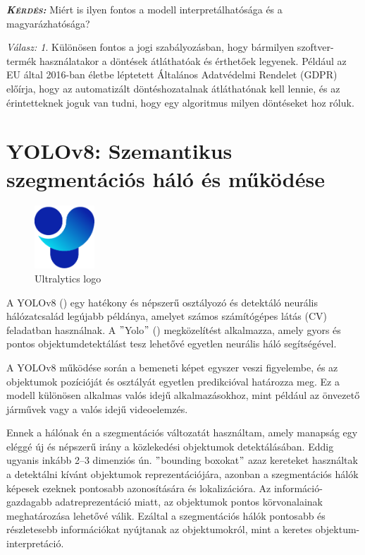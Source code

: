 \documentclass[12pt,oneside,a4paper]{article}
\newcommand{\newsection}[1]{\clearpage\section{#1}}\label{makro}
\theoremstyle{remark}
\newtheorem*{remarkth}{Válasz: \newline}
\newenvironment{remark}{\begin{remarkth}}{\end{remarkth}}
\newenvironment{kerdes}{
	\medskip%
	\par\noindent\ignorespaces%
	\textit{\textsc{\textbf{Kérdés: }}}%
	\medskip
	\textsf%
}{%
	\medskip
}
\begin{document}
	
	\begin{kerdes}
		Miért is ilyen fontos a modell interpretálhatósága és a magyarázhatósága?
	\end{kerdes}
	\begin{remark}
		Különösen fontos a jogi szabályozásban, hogy bármilyen szoftver-termék használatakor a döntések átláthatóak és
		érthetőek legyenek.
		Például az \ac{EU} által 2016-ban életbe léptetett Általános Adatvédelmi Rendelet (\ac{GDPR}) előírja, hogy az
		automatizált döntéshozatalnak átláthatónak kell lennie, és az érintetteknek joguk van tudni, hogy egy algoritmus
		milyen döntéseket hoz róluk.
	\end{remark}
	\newsection{YOLOv8: Szemantikus szegmentációs háló és működése}\label{sec:yolov8:-szemantikus-szegmentacios-halo}
	\begin{figure}
		\centering
		\includegraphics[width=0.2\textwidth]{Ultralytics}
		\caption{Ultralytics logo}
		\label{fig:Ultralytics}
	\end{figure}
	A YOLOv8 (\cite{Yolov8})\label{irodalomhivatkozas} egy hatékony és népszerű osztályozó és detektáló neurális
	hálózatcsalád legújabb példánya, amelyet számos számítógépes látás (\ac{CV})
	feladatban használnak.
	A \("\)\gls{Yolo}\("\) () megközelítést alkalmazza,
	amely gyors és pontos objektumdetektálást tesz lehetővé egyetlen neurális háló segítségével.
	
	
	A YOLOv8 működése során a bemeneti képet egyszer veszi figyelembe, és az objektumok pozícióját
	és osztályát egyetlen predikcióval határozza meg.
	Ez a modell különösen alkalmas valós
	idejű alkalmazásokhoz, mint például az önvezető járművek vagy a valós idejű videoelemzés.
	
	Ennek a hálónak én a szegmentációs változatát használtam, amely manapság egy eléggé új és népszerű
	irány a közlekedési objektumok detektálásában.
	Eddig ugyanis inkább 2--3 dimenziós ún. \("\)bounding boxokat\("\) azaz kereteket használtak a detektálni kívánt
	objektumok reprezentációjára, azonban a szegmentációs hálók képesek  ezeknek pontosabb azonosítására és
	lokalizációra.
	Az információ-gazdagabb  adatreprezentáció miatt, az objektumok pontos körvonalainak meghatározása lehetővé válik.
	Ezáltal a szegmentációs hálók pontosabb és részletesebb információkat nyújtanak az objektumokról,
	mint a keretes objektum-interpretáció.
	
\end{document}
